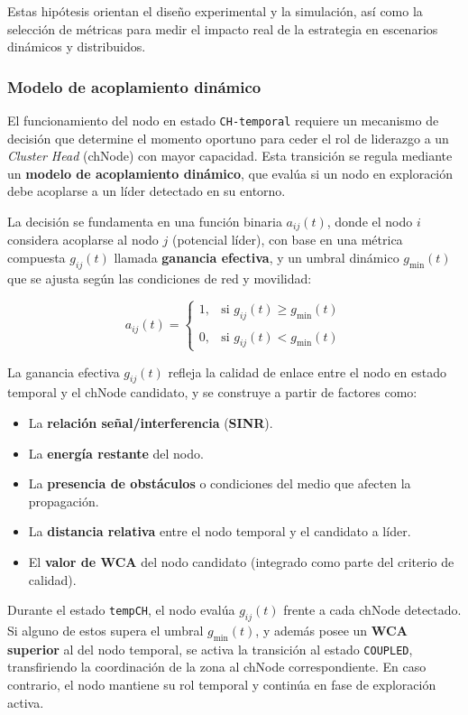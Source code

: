 \documentclass{article}
\begin{document}
Estas hipótesis orientan el diseño experimental y la simulación, así como la selección de métricas para medir el impacto real de la estrategia en escenarios dinámicos y distribuidos.

\subsubsection{Modelo de acoplamiento dinámico}
El funcionamiento del nodo en estado \texttt{CH-temporal} requiere un mecanismo de decisión que determine el momento oportuno para ceder el rol de liderazgo a un \textit{Cluster Head} (chNode) con mayor capacidad. Esta transición se regula mediante un \textbf{modelo de acoplamiento dinámico}, que evalúa si un nodo en exploración debe acoplarse a un líder detectado en su entorno.

La decisión se fundamenta en una función binaria $a_{ij}(t)$, donde el nodo $i$ considera acoplarse al nodo $j$ (potencial líder), con base en una métrica compuesta $g_{ij}(t)$ llamada \textbf{ganancia efectiva}, y un umbral dinámico $g_{\min}(t)$ que se ajusta según las condiciones de red y movilidad:

\[
a_{ij}(t) = 
\begin{cases} 
1, & \text{si } g_{ij}(t) \geq g_{\min}(t) \\\\
0, & \text{si } g_{ij}(t) < g_{\min}(t)
\end{cases}
\]

La ganancia efectiva $g_{ij}(t)$ refleja la calidad de enlace entre el nodo en estado temporal y el chNode candidato, y se construye a partir de factores como:

\begin{itemize}
    \item La \textbf{relación señal/interferencia} (\textbf{SINR}).
    \item La \textbf{energía restante} del nodo.
    \item La \textbf{presencia de obstáculos} o condiciones del medio que afecten la propagación.
    \item La \textbf{distancia relativa} entre el nodo temporal y el candidato a líder.
    \item El \textbf{valor de WCA} del nodo candidato (integrado como parte del criterio de calidad).
\end{itemize}

Durante el estado \texttt{tempCH}, el nodo evalúa $g_{ij}(t)$ frente a cada chNode detectado. Si alguno de estos supera el umbral $g_{\min}(t)$, y además posee un \textbf{WCA superior} al del nodo temporal, se activa la transición al estado \texttt{COUPLED}, transfiriendo la coordinación de la zona al chNode correspondiente. En caso contrario, el nodo mantiene su rol temporal y continúa en fase de exploración activa.
\end{document}
